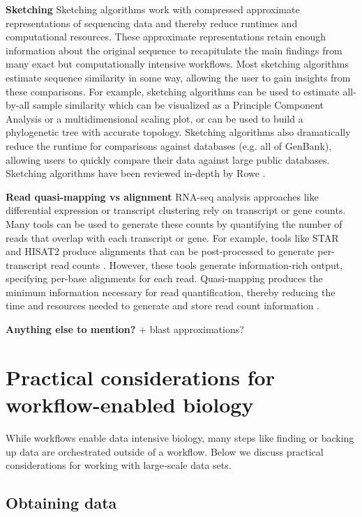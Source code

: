 \documentclass[10pt,letterpaper]{article}
\begin{document}
\textbf{Sketching} Sketching algorithms work with compressed approximate representations of sequencing data and thereby reduce runtimes and computational resources. 
These approximate representations retain enough information about the original sequence to recapitulate the main findings from many exact but computationally intensive workflows. 
Most sketching algorithms estimate sequence similarity in some way, allowing the user to gain insights from these comparisons.
For example, sketching algorithms can be used to estimate all-by-all sample similarity which can be visualized as a Principle Component Analysis or a multidimensional scaling plot, or can be used to build a phylogenetic tree with accurate topology. 
Sketching algorithms also dramatically reduce the runtime for comparisons against databases (e.g. all of GenBank), allowing users to quickly compare their data against large public databases. 
Sketching algorithms have been reviewed in-depth by Rowe \cite{rowe2019streaming}.

\textbf{Read quasi-mapping vs alignment} RNA-seq analysis approaches like differential expression or transcript clustering rely on transcript or gene counts.
Many tools can be used to generate these counts by quantifying the number of reads that overlap with each transcript or gene.
For example, tools like STAR and HISAT2 produce alignments that can be post-processed to generate per-transcript read counts \cite{dobin2013star, kim2019graph}.
However, these tools generate information-rich output, specifying per-base alignments for each read.
Quasi-mapping produces the minimum information necessary for read quantification, thereby reducing the time and resources needed to generate and store read count information \cite{srivastava2016rapmap}. 

\textbf{Anything else to mention?}  
+ blast approximations?


\section*{Practical considerations for workflow-enabled biology}

While workflows enable data intensive biology, many steps like finding or backing up data are orchestrated outside of a workflow.
Below we discuss practical considerations for working with large-scale data sets.

\subsection*{Obtaining data}
\end{document}
